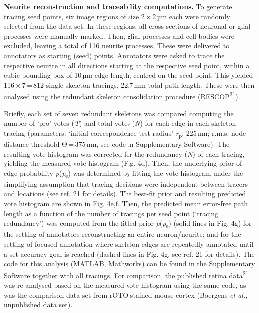 \documentclass{article}
\begin{document}
\textbf{Neurite reconstruction and traceability computations.} To generate tracing seed points, six image regions of size 2\,×\,2\,µm each were randomly selected from the data set. In these regions, all cross-sections of neuronal or glial processes were manually marked. Then, glial processes and cell bodies were excluded, leaving a total of 116 neurite processes. These were delivered to annotators as starting (seed) points. Annotators were asked to trace the respective neurite in all directions starting at the respective seed point, within a cubic bounding box of 10\,µm edge length, centred on the seed point. This yielded 116\,×\,7\,=\,812 single skeleton tracings, 22.7\,mm total path length. These were then analysed using the redundant skeleton consolidation procedure (RESCOP\textsuperscript{21}).

Briefly, each set of seven redundant skeletons was compared computing the number of `pro' votes (\emph{T}) and total votes (\emph{N}) for each edge in each skeleton tracing (parameters: `initial correspondence test radius' \emph{r}\textsubscript{p}: 225\,nm; r.m.s. node distance threshold Θ\,=\,375\,nm, see code in Supplementary Software). The resulting vote histogram was corrected for the redundancy (\emph{N}) of each tracing, yielding the measured vote histogram (Fig. 4d). Then, the underlying prior of edge probability \emph{p}(\emph{p}\textsubscript{e}) was determined by fitting the vote histogram under the simplifying assumption that tracing decisions were independent between tracers and locations (see ref. 21 for details). The best-fit prior and resulting predicted vote histogram are shown in Fig. 4e,f. Then, the predicted mean error-free path length as a function of the number of tracings per seed point (`tracing redundancy') was computed from the fitted prior \emph{p}(\emph{p}\textsubscript{e}) (solid lines in Fig. 4g) for the setting of annotators reconstructing an entire neuron/neurite; and for the setting of focused annotation where skeleton edges are repeatedly annotated until a set accuracy goal is reached (dashed lines in Fig. 4g, see ref. 21 for details). The code for this analysis (MATLAB, Mathworks) can be found in the Supplementary Software together with all tracings. For comparison, the published retina data\textsuperscript{21} was re-analysed based on the measured vote histogram using the same code, as was the comparison data set from rOTO-stained mouse cortex (Boergens \emph{et al.}, unpublished data set).
\end{document}
